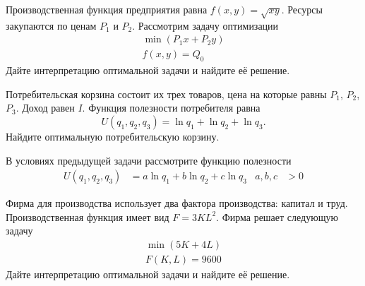 \begin{exercise}
Производственная функция предприятия равна $f(x,y)=\sqrt{xy}$. Ресурсы
закупаются по ценам $P_1$ и $P_2$. Рассмотрим задачу оптимизации
\begin{gather*}
	\min (P_1x+P_2 y) \\  f(x,y)=Q_0
\end{gather*}
Дайте интерпретацию оптимальной задачи и найдите её решение.
\end{exercise}

\begin{exercise}
Потребительская корзина состоит их трех товаров, цена на которые равны
$P_1$, $P_2$, $P_3$. Доход равен $I$.  Функция полезности потребителя равна
\[
	U(q_1,q_2,q_3)=\ln q_1+\ln q_2+\ln q_3.
\]
Найдите оптимальную потребительскую корзину.
\end{exercise}

\begin{exercise}
В условиях предыдущей задачи рассмотрите функцию полезности
\begin{align*}
	U(q_1,q_2,q_3)&=a\ln q_1+b\ln q_2+c\ln q_3 &
	a,b,c&>0
\end{align*}
\end{exercise}

\begin{exercise}
Фирма для производства использует два фактора производства: капитал и труд.
Производственная функция имеет вид $F=3KL^2$. Фирма решает следующую задачу
\begin{gather*}
	\min(5K+4L) \\ F(K,L)=9600
\end{gather*}
Дайте интерпретацию оптимальной задачи и найдите её решение. 
\end{exercise}